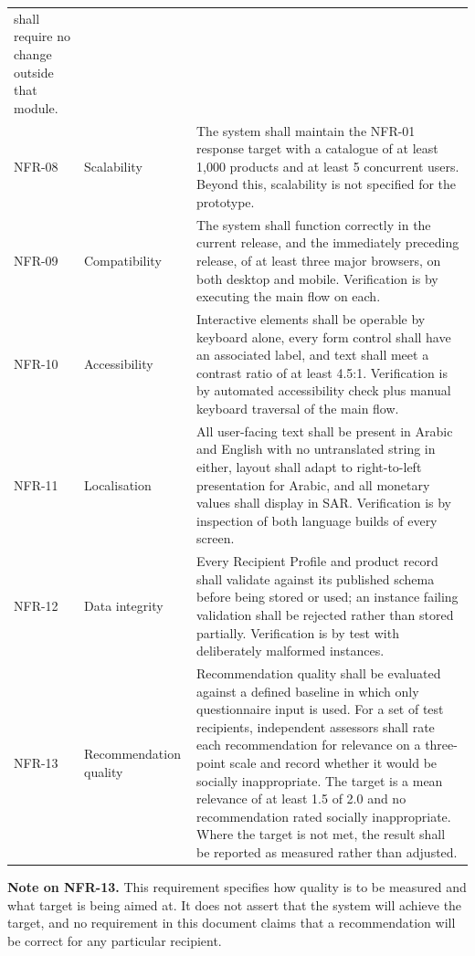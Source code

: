 \documentclass[11pt,a4paper]{report}
\begin{document}
\begin{longtable}{@{}L{1.9cm}L{3.2cm}L{9.4cm}@{}}
shall require no change outside that module. \\
NFR-08 & Scalability &
The system shall maintain the NFR-01 response target with a catalogue of at least 1{,}000
products and at least 5 concurrent users. Beyond this, scalability is not specified for the
prototype. \\
NFR-09 & Compatibility &
The system shall function correctly in the current release, and the immediately preceding
release, of at least three major browsers, on both desktop and mobile. Verification is by
executing the main flow on each. \\
NFR-10 & Accessibility &
Interactive elements shall be operable by keyboard alone, every form control shall have an
associated label, and text shall meet a contrast ratio of at least 4.5:1. Verification is by
automated accessibility check plus manual keyboard traversal of the main flow. \\
NFR-11 & Localisation &
All user-facing text shall be present in Arabic and English with no untranslated string in
either, layout shall adapt to right-to-left presentation for Arabic, and all monetary values
shall display in SAR. Verification is by inspection of both language builds of every screen. \\
NFR-12 & Data integrity &
Every Recipient Profile and product record shall validate against its published schema before
being stored or used; an instance failing validation shall be rejected rather than stored
partially. Verification is by test with deliberately malformed instances. \\
NFR-13 & Recommendation quality &
Recommendation quality shall be evaluated against a defined baseline in which only
questionnaire input is used. For a set of test recipients, independent assessors shall rate
each recommendation for relevance on a three-point scale and record whether it would be
socially inappropriate. The target is a mean relevance of at least 1.5 of 2.0 and no
recommendation rated socially inappropriate. Where the target is not met, the result shall be
reported as measured rather than adjusted. \\
\end{longtable}

\noindent\textbf{Note on NFR-13.} This requirement specifies how quality is to be measured and
what target is being aimed at. It does not assert that the system will achieve the target, and
no requirement in this document claims that a recommendation will be correct for any
particular recipient.
\end{document}
